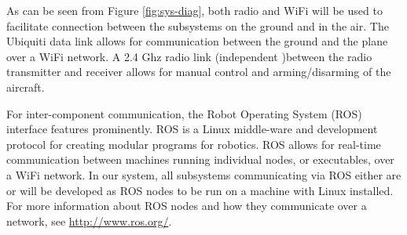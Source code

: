 \documentclass[]{auvsi_doc}
\begin{document}
As can be seen from Figure \ref{fig:sys-diag}, both radio and WiFi will be used to facilitate connection between the subsystems on the ground and in the air. The Ubiquiti data link allows for communication between the ground and the plane over a WiFi network. A 2.4 Ghz radio link (independent )between the radio transmitter and receiver allows for manual control and arming/disarming of the aircraft.

For inter-component communication, the Robot Operating System (ROS) interface features prominently. ROS is a Linux middle-ware and development protocol for creating modular programs for robotics. ROS allows for real-time communication between machines running individual nodes, or executables, over a WiFi network. In our system, all subsystems communicating via ROS either are or will be developed as ROS nodes to be run on a machine with Linux installed. For more information about ROS nodes and how they communicate over a network, see \url{http://www.ros.org/}.
\end{document}
